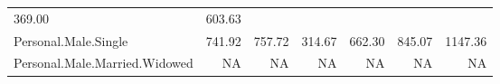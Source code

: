 \documentclass[]{article}
\begin{document}
\begin{longtable}[]{@{}lrrrrrr@{}}
\begin{minipage}[t]{0.08\columnwidth}
369.00\strut
\end{minipage} & \begin{minipage}[t]{0.08\columnwidth}\raggedleft\strut
603.63\strut
\end{minipage}\tabularnewline
\begin{minipage}[t]{0.31\columnwidth}\raggedright\strut
Personal.Male.Single\strut
\end{minipage} & \begin{minipage}[t]{0.10\columnwidth}\raggedleft\strut
741.92\strut
\end{minipage} & \begin{minipage}[t]{0.08\columnwidth}\raggedleft\strut
757.72\strut
\end{minipage} & \begin{minipage}[t]{0.08\columnwidth}\raggedleft\strut
314.67\strut
\end{minipage} & \begin{minipage}[t]{0.08\columnwidth}\raggedleft\strut
662.30\strut
\end{minipage} & \begin{minipage}[t]{0.08\columnwidth}\raggedleft\strut
845.07\strut
\end{minipage} & \begin{minipage}[t]{0.08\columnwidth}\raggedleft\strut
1147.36\strut
\end{minipage}\tabularnewline
\begin{minipage}[t]{0.31\columnwidth}\raggedright\strut
Personal.Male.Married.Widowed\strut
\end{minipage} & \begin{minipage}[t]{0.10\columnwidth}\raggedleft\strut
NA\strut
\end{minipage} & \begin{minipage}[t]{0.08\columnwidth}\raggedleft\strut
NA\strut
\end{minipage} & \begin{minipage}[t]{0.08\columnwidth}\raggedleft\strut
NA\strut
\end{minipage} & \begin{minipage}[t]{0.08\columnwidth}\raggedleft\strut
NA\strut
\end{minipage} & \begin{minipage}[t]{0.08\columnwidth}\raggedleft\strut
NA\strut
\end{minipage} & \begin{minipage}[t]{0.08\columnwidth}\raggedleft\strut
NA\strut
\end{minipage}\tabularnewline

\end{longtable}
\end{document}
